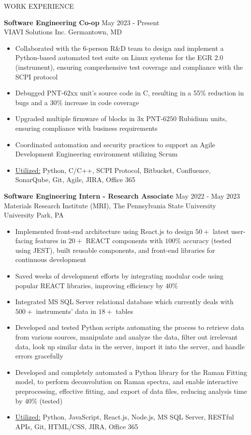 \documentclass{resume} %
\begin{document}
\begin{rSection}{WORK EXPERIENCE}

{\bf Software Engineering Co-op} \hfill May $2023$ - Present\\
VIAVI Solutions Inc. \hfill Germantown, MD
\begin{itemize}[itemsep = -4pt]
    \item Collaborated with the 6-person R\&D team to design and implement a Python-based automated test suite on Linux systems for the EGR $2.0$ (instrument), ensuring comprehensive test coverage and compliance with the SCPI protocol
    \item Debugged PNT-$62$xx unit's source code in C, resulting in a 55\% reduction in bugs and a 30\% increase in code coverage
    \item Upgraded multiple firmware of blocks in $3$x PNT-$6250$ Rubidium units, ensuring compliance with business requirements
    \item Coordinated automation and security practices to support an Agile Development Engineering environment utilizing Scrum
    \item \underline{Utilized:} Python, C/C++, SCPI Protocol, Bitbucket, Confluence, SonarQube, Git, Agile, JIRA, Office 365
\end{itemize}

{\bf Software Engineering Intern - Research Associate} \hfill May $2022$ - May $2023$\\
Materials Research Institute (MRI), The Pennsylvania State University \hfill University Park, PA
\begin{itemize}[itemsep = -4pt]
    \item Implemented front-end architecture using React.js to design $50+$ latest user-facing features in $20+$ REACT components with $100\%$ accuracy (tested using JEST), built reusable components, and front-end libraries for continuous development
    \item Saved weeks of development efforts by integrating modular code using popular REACT libraries, improving efficiency by $40\%$
    \item Integrated MS SQL Server relational database which currently deals with $500+$ instruments' data in $18+$ tables
    \item Developed and tested Python scripts automating the process to retrieve data from various sources, manipulate and analyze the data, filter out irrelevant data, look up similar data in the server, import it into the server, and handle errors gracefully
    \item Developed and completely automated a Python library for the Raman Fitting model, to perform deconvolution on Raman spectra, and enable interactive preprocessing, effective fitting, and export of data files, reducing analysis time by $40\%$ (tested)
    \item \underline{Utilized:} Python, JavaScript, React.js, Node.js, MS SQL Server, RESTful APIs, Git, HTML/CSS, JIRA, Office 365
\end{itemize}


\end{rSection}
\end{document}
